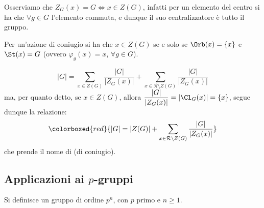\documentclass[11pt]{scrartcl}
\begin{document}
\begin{remark}
    Osserviamo che $Z_G(x) = G \iff x \in Z(G)$, infatti per un elemento del centro si ha che 
    $\forall g \in G$ l'elemento commuta, e dunque il suo centralizzatore è tutto il gruppo.
\end{remark}

\begin{remark}
    Per un'azione di coniugio si ha che $x \in Z(G)$ se e solo se $\Orb(x) = \{x\}$ e $\St(x) = G$ (ovvero $\varphi_g(x) = x$, $\forall g \in G$).
\end{remark}

    \[ |G| = \sum_{x \in Z(G)} \frac{|G|}{|Z_G(x)|} + \sum_{x \in \mathcal{R}\setminus Z(G)} \frac{|G|}{|Z_G(x)|}
        \]
ma, per quanto detto, se $x \in Z(G)$, allora $\displaystyle\frac{|G|}{|Z_G(x)|} = |\Cl_G(x)| = \{x\}$, segue dunque la relazione:
    \[ \colorboxed{red}{|G| = |Z(G)| + \sum_{x \in \mathcal{R}\setminus Z(G)} \frac{|G|}{|Z_G(x)|}}
        \]
che prende il nome di  (di coniugio).

\newpage
\subsection{Applicazioni ai $p$-gruppi}
\label{pgruppi}
\begin{definition}
    Si definisce  un gruppo di ordine $p^n$, con $p$ primo e $n \geq 1$.
\end{definition}
\end{document}
